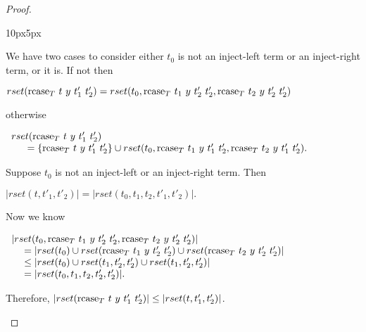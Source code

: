 \begin{proof}
\begin{changemargin}{10px}{5px}
\begin{itemize}
\begin{itemize}
    We have two cases to consider either $t_0$ is not an inject-left term or an inject-right term, or it is.
    If not then
    \begin{center}
      \begin{math}
        rset(\mbox{rcase}_{T}\ t\ y\ t'_1\ t'_2) =
        rset(t_0,\mbox{rcase}_{T}\ t_1\ y\ t'_2\ t'_2,\mbox{rcase}_{T}\ t_2\ y\ t'_2\ t'_2) 
      \end{math}
    \end{center}
    otherwise 
    \begin{center}
      \begin{math}
        \begin{array}{lll}
          rset(\mbox{rcase}_{T}\ t\ y\ t'_1\ t'_2) \\
          \text{\ \ \ \ } = \{\mbox{rcase}_{T}\ t\ y\ t'_1\ t'_2\} \cup
          rset(t_0,\mbox{rcase}_{T}\ t_1\ y\ t'_1\ t'_2,\mbox{rcase}_{T}\ t_2\ y\ t'_1\ t'_2).
        \end{array}
      \end{math}
    \end{center}
    Suppose $t_0$ is not an inject-left or an inject-right term.  Then
    \begin{center}
      \begin{math}
        |rset(t, t'_1, t'_2)| = |rset(t_0, t_1, t_2, t'_1, t'_2)|.
      \end{math}
    \end{center}
    Now we know 
    \begin{center}
      \begin{math}
        \begin{array}{ll}
          |rset(t_0,\mbox{rcase}_{T}\ t_1\ y\ t'_2\ t'_2,\mbox{rcase}_{T}\ t_2\ y\ t'_2\ t'_2)|\\
          \text{\ \ \ } = 
          |rset(t_0) \cup rset(\mbox{rcase}_{T}\ t_1\ y\ t'_2\ t'_2) \cup rset(\mbox{rcase}_{T}\ t_2\ y\ t'_2\ t'_2)|\\
          \text{\ \ \ } \leq  |rset(t_0) \cup rset(t_1,t'_2,t'_2) \cup rset(t_1,t'_2,t'_2)| \\
          \text{\ \ \ } =   |rset(t_0, t_1,t_2,t'_2,t'_2)|.
        \end{array}
      \end{math}
    \end{center}
    Therefore, $|rset(\mbox{rcase}_{T}\ t\ y\ t'_1\ t'_2)| \leq |rset(t, t'_1, t'_2)|$.
        

\end{itemize}
\end{itemize}
\end{changemargin}
\end{proof}

